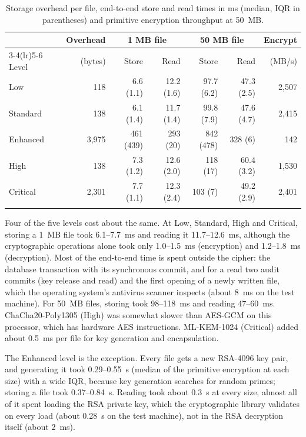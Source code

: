 \documentclass[pdflatex,sn-mathphys-num]{sn-jnl}
\begin{document}
\begin{table}[h]
\caption{Storage overhead per file, end-to-end store and read times in ms (median, IQR in
parentheses) and primitive encryption throughput at 50~MB.}\label{tab5}
\begin{tabular}{@{}lrrrrrr@{}}
\toprule
 & Overhead & \multicolumn{2}{c}{1 MB file} & \multicolumn{2}{c}{50 MB file} & Encrypt \\
\cmidrule(lr){3-4}\cmidrule(lr){5-6}
Level & (bytes) & Store & Read & Store & Read & (MB/s) \\
\midrule
Low & 118 & 6.6 (1.1) & 12.2 (1.6) & 97.7 (6.2) & 47.3 (2.5) & 2{,}507 \\
Standard & 138 & 6.1 (1.4) & 11.7 (1.4) & 99.8 (7.9) & 47.6 (4.7) & 2{,}415 \\
Enhanced & 3{,}975 & 461 (439) & 293 (20) & 842 (478) & 328 (6) & 142 \\
High & 138 & 7.3 (1.2) & 12.6 (2.0) & 118 (17) & 60.4 (3.2) & 1{,}530 \\
Critical & 2{,}301 & 7.7 (1.1) & 12.3 (2.4) & 103 (7) & 49.2 (2.9) & 2{,}401 \\
\botrule
\end{tabular}
\end{table}

Four of the five levels cost about the same. At Low, Standard, High and Critical, storing a 1~MB
file took 6.1--7.7~ms and reading it 11.7--12.6~ms, although the cryptographic operations alone
took only 1.0--1.5~ms (encryption) and 1.2--1.8~ms (decryption). Most of the end-to-end time is
spent outside the cipher: the database transaction with its synchronous commit, and for a read
two audit commits (key release and read) and the first opening of a newly written file, which the
operating system's antivirus scanner inspects (about 8~ms on the test machine). For 50~MB files,
storing took 98--118~ms and reading 47--60~ms. ChaCha20-Poly1305 (High) was somewhat slower than
AES-GCM on this processor, which has hardware AES instructions. ML-KEM-1024 (Critical) added about
0.5~ms per file for key generation and encapsulation.

The Enhanced level is the exception. Every file gets a new RSA-4096 key pair, and generating it
took 0.29--0.55~s (median of the primitive encryption at each size) with a wide IQR, because key generation searches
for random primes; storing a file took 0.37--0.84~s. Reading took about 0.3~s at every size, almost
all of it spent loading the RSA private key, which the cryptographic library validates on every
load (about 0.28~s on the test machine), not in the RSA decryption itself (about 2~ms).
\end{document}
